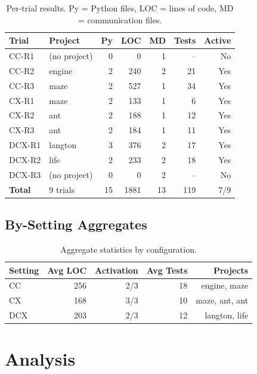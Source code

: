 \documentclass[11pt,a4paper]{article}
\begin{document}
\begin{table}[h]
\centering
\begin{tabular}{llrrrrr}
\toprule
\textbf{Trial} & \textbf{Project} & \textbf{Py} & \textbf{LOC} & \textbf{MD} & \textbf{Tests} & \textbf{Active} \\
\midrule
CC-R1 & (no project) & 0 & 0 & 1 & -- & No \\
CC-R2 & engine & 2 & 240 & 2 & 21 & Yes \\
CC-R3 & maze & 2 & 527 & 1 & 34 & Yes \\
CX-R1 & maze & 2 & 133 & 1 & 6 & Yes \\
CX-R2 & ant & 2 & 188 & 1 & 12 & Yes \\
CX-R3 & ant & 2 & 184 & 1 & 11 & Yes \\
DCX-R1 & langton & 3 & 376 & 2 & 17 & Yes \\
DCX-R2 & life & 2 & 233 & 2 & 18 & Yes \\
DCX-R3 & (no project) & 0 & 0 & 2 & -- & No \\
\midrule
\textbf{Total} & 9 trials & 15 & 1881 & 13 & 119 & 7/9 \\
\bottomrule
\end{tabular}
\caption{Per-trial results. Py = Python files, LOC = lines of code, MD = communication files.}
\label{tab:results}
\end{table}

\subsection{By-Setting Aggregates}

\begin{table}[h]
\centering
\begin{tabular}{lrrrr}
\toprule
\textbf{Setting} & \textbf{Avg LOC} & \textbf{Activation} & \textbf{Avg Tests} & \textbf{Projects} \\
\midrule
CC & 256 & 2/3 & 18 & engine, maze \\
CX & 168 & 3/3 & 10 & maze, ant, ant \\
DCX & 203 & 2/3 & 12 & langton, life \\
\bottomrule
\end{tabular}
\caption{Aggregate statistics by configuration.}
\label{tab:aggregates}
\end{table}

\section{Analysis}
\end{document}
